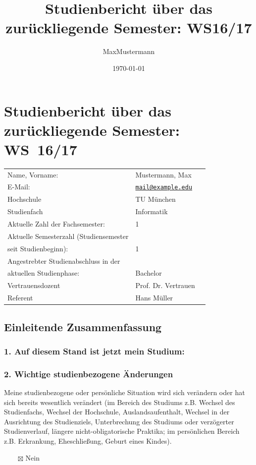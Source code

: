 \documentclass[a4paper,12pt,parskip=full]{article}
\makeatletter
\newcommand{\Jahr}{16/17}
\newcommand{\Semester}{WS}
\newcommand{\Datum}{\today}
\newcommand{\Semesteranzahl}{1}
\newcommand{\Abschluss}{Bachelor}
\newcommand{\Studienfach}{Informatik}
\newcommand{\University}{TU München}
\newcommand{\Nachname}{Mustermann}
\newcommand{\Vorname}{Max}
\newcommand{\Email}{mail@example.edu}
\newcommand{\Vertrauensdozent}{Prof. Dr. Vertrauen}
\newcommand{\Referent}{Hans Müller}
\makeatother
\begin{document}
\title{Studienbericht über das zurückliegende Semester: \Semester \Jahr}
\author{\Vorname \Nachname}
\date{\Datum}

\section*{Studienbericht über das zurückliegende Semester: \Semester~\Jahr}

\begin{tabularx}{\textwidth}{@{}llX}
Name, Vorname:   & \Nachname, \Vorname \\
E-Mail:           &\href{mailto:\Email}{\nolinkurl{\Email} } \\
Hochschule         & \University \\
Studienfach         & \Studienfach \\
Aktuelle Zahl der Fachsemester: & \Semesteranzahl \\
Aktuelle Semesterzahl
(Studiensemester\\ seit Studienbeginn):        & \Semesteranzahl \\
Angestrebter Studienabschluss in der \\
aktuellen Studienphase: & \Abschluss \\
Vertrauensdozent    & \Vertrauensdozent \\
Referent            & \Referent \\
\end{tabularx}
\subsection*{Einleitende Zusammenfassung}
\subsubsection*{1. Auf diesem Stand ist jetzt mein Studium:}
\blindtext
\subsubsection*{2. Wichtige studienbezogene Änderungen}
\begin{framed}\noindent
Meine studienbezogene oder persönliche Situation wird sich verändern oder hat sich bereits wesentlich verändert (im Bereich des Studiums z.B. Wechsel des Studienfachs, Wechsel der Hochschule, Auslandsaufenthalt, Wechsel in der Ausrichtung des Studienziels, Unterbrechung des Studiums oder verzögerter Studienverlauf, längere nicht-obligatorische Praktika; im persönlichen Bereich z.B. Erkrankung, Eheschließung, Geburt eines Kindes).\end{framed} 
~~~~$\boxtimes$ Nein
\end{document}
